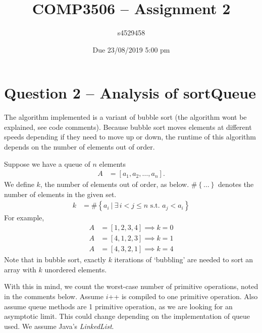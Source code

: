\documentclass[11pt,a4paper]{article} %
\author{s4529458}
\date{{Due 23/08/2019 5:00 pm}}
\title{COMP3506 -- Assignment 2}
\begin{document}
%

\setcounter{page}{1}
\maketitle
\section*{Question 2 -- {Analysis of {sortQueue}}}

The algorithm implemented is a variant of bubble sort (the algorithm wont be
explained, see code comments). Because bubble sort moves elements at different speeds
depending if they need to move up or down, 
the runtime of this algorithm depends on the number
of elements out of order. 

Suppose we have a queue of $n$ elements
\begin{align*}
    A &= \left[ a_1, a_2, \ldots, a_n \right].
\end{align*}
We define $k$, the number of elements 
out of order, as below. $\# \left\{ \ldots\right\}$ denotes the number of elements in the given set.
\begin{align*}
    k &= \# \left\{a_i ~|~ \exists\, i < j \le n \text{ s.t. } a_j < a_i\right\}
\end{align*}
For example, 
\begin{align*}
    A &= \left[ 1, 2, 3, 4 \right] \implies k = 0 \\ 
    A &= \left[ 4, 1, 2, 3 \right] \implies k = 1 \\ 
    A &= \left[ 4, 3, 2, 1 \right] \implies k = 4
\end{align*}
Note that in bubble sort, exactly $k$ iterations of `bubbling' are needed to sort
an array with $k$ unordered elements.

With this in mind, we count the worst-case number of primitive operations,
noted in the comments below. Assume $i$++ is compiled to one primitive operation.
Also assume queue methods are 1 primitive operation, as we are looking for an asymptotic 
limit. This could change depending 
on the implementation of queue used. We assume Java's \textit{LinkedList}.
\end{document}
